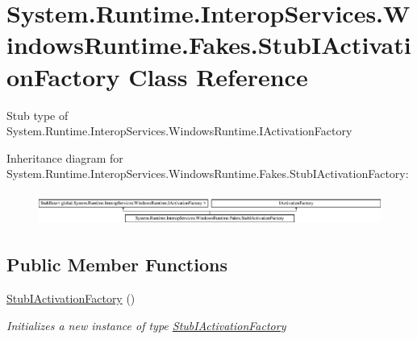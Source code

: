 \hypertarget{class_system_1_1_runtime_1_1_interop_services_1_1_windows_runtime_1_1_fakes_1_1_stub_i_activation_factory}{\section{System.\-Runtime.\-Interop\-Services.\-Windows\-Runtime.\-Fakes.\-Stub\-I\-Activation\-Factory Class Reference}
\label{class_system_1_1_runtime_1_1_interop_services_1_1_windows_runtime_1_1_fakes_1_1_stub_i_activation_factory}
}


Stub type of System.\-Runtime.\-Interop\-Services.\-Windows\-Runtime.\-I\-Activation\-Factory 


Inheritance diagram for System.\-Runtime.\-Interop\-Services.\-Windows\-Runtime.\-Fakes.\-Stub\-I\-Activation\-Factory\-:\begin{figure}[H]
\begin{center}
\leavevmode
\includegraphics[height=1.074856cm]{class_system_1_1_runtime_1_1_interop_services_1_1_windows_runtime_1_1_fakes_1_1_stub_i_activation_factory}
\end{center}
\end{figure}
\subsection*{Public Member Functions}
\begin{DoxyCompactItemize}
\item 
\hyperlink{class_system_1_1_runtime_1_1_interop_services_1_1_windows_runtime_1_1_fakes_1_1_stub_i_activation_factory_a740b0b6d029e1e653ca3e605df0b19d3}{Stub\-I\-Activation\-Factory} ()
\begin{DoxyCompactList}\small\item\em Initializes a new instance of type \hyperlink{class_system_1_1_runtime_1_1_interop_services_1_1_windows_runtime_1_1_fakes_1_1_stub_i_activation_factory}{Stub\-I\-Activation\-Factory}\end{DoxyCompactList}\end{DoxyCompactItemize}
